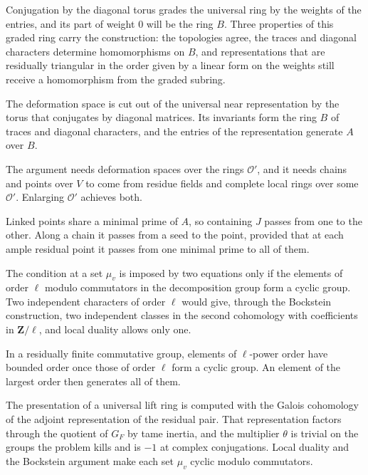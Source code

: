 Conjugation by the diagonal torus grades the universal ring by the weights of the entries, and its part of weight $0$ will be the ring $B$. Three properties of this graded ring carry the construction: the topologies agree, the traces and diagonal characters determine homomorphisms on $B$, and representations that are residually triangular in the order given by a linear form on the weights still receive a homomorphism from the graded subring.

The deformation space is cut out of the universal near representation by the torus that conjugates by diagonal matrices. Its invariants form the ring $B$ of traces and diagonal characters, and the entries of the representation generate $A$ over $B$.

The argument needs deformation spaces over the rings $\mathcal O'$, and it needs chains and points over $V$ to come from residue fields and complete local rings over some $\mathcal O'$. Enlarging $\mathcal O'$ achieves both.

Linked points share a minimal prime of $A$, so containing $J$ passes from one to the other. Along a chain it passes from a seed to the point, provided that at each ample residual point it passes from one minimal prime to all of them.

The condition at a set $\mu_v$ is imposed by two equations only if the elements of order $\ell$ modulo commutators in the decomposition group form a cyclic group. Two independent characters of order $\ell$ would give, through the Bockstein construction, two independent classes in the second cohomology with coefficients in $\mathbf Z/\ell$, and local duality allows only one.

In a residually finite commutative group, elements of $\ell$-power order have bounded order once those of order $\ell$ form a cyclic group. An element of the largest order then generates all of them.

The presentation of a universal lift ring is computed with the Galois cohomology of the adjoint representation of the residual pair. That representation factors through the quotient of $G_F$ by tame inertia, and the multiplier $\theta$ is trivial on the groups the problem kills and is $-1$ at complex conjugations. Local duality and the Bockstein argument make each set $\mu_v$ cyclic modulo commutators.


